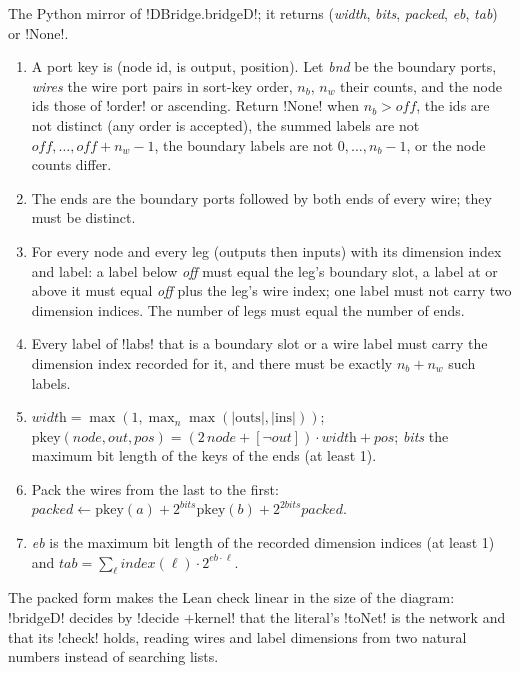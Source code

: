 {\begin{algorithm}[\py!_bridge_plan(d, net, off, legs, labs, order=None)!]\label{alg:lean-export-net-bridge}
The Python mirror of \lean!DBridge.bridgeD!; it returns
(\textit{width}, \textit{bits}, \textit{packed}, \textit{eb}, \textit{tab}) or \py!None!.
\begin{enumerate}
\item A port key is (node id, is output, position). Let \textit{bnd} be the boundary ports,
  \textit{wires} the wire port pairs in sort-key order, $n_b$, $n_w$ their counts, and the node
  ids those of \py!order! or ascending. Return \py!None! when $n_b > \textit{off}$, the ids are not
  distinct (any order is accepted), the summed labels are not $\textit{off},\dots,\textit{off}+n_w-1$, the
  boundary labels are not $0,\dots,n_b-1$, or the node counts differ.
\item The ends are the boundary ports followed by both ends of every wire; they must be
  distinct.
\item For every node and every leg (outputs then inputs) with its dimension index and label:
  a label below \textit{off} must equal the leg's boundary slot, a label at or above it must
  equal \textit{off} plus the leg's wire index; one label must not carry two dimension indices.
  The number of legs must equal the number of ends.
\item Every label of \py!labs! that is a boundary slot or a wire label must carry the dimension
  index recorded for it, and there must be exactly $n_b + n_w$ such labels.
\item $\textit{width} = \max(1, \max_n \max(|\text{outs}|, |\text{ins}|))$;
  $\mathrm{pkey}(\textit{node},\textit{out},\textit{pos}) =
  (2\,\textit{node} + [\lnot\textit{out}])\cdot\textit{width} + \textit{pos}$;
  \textit{bits} the maximum bit length of the keys of the ends (at least 1).
\item Pack the wires from the last to the first:
  $\textit{packed} \leftarrow \mathrm{pkey}(a) + 2^{\textit{bits}}\mathrm{pkey}(b) +
  2^{2\textit{bits}}\textit{packed}$.
\item \textit{eb} is the maximum bit length of the recorded dimension indices (at least 1) and
  $\textit{tab} = \sum_\ell \textit{index}(\ell)\cdot 2^{\textit{eb}\cdot \ell}$.
\end{enumerate}
\end{algorithm}

The packed form makes the Lean check linear in the size of the diagram: \lean!bridgeD! decides by
\lean!decide +kernel! that the literal's \lean!toNet! is the network and that its \lean!check!
holds, reading wires and label dimensions from two natural numbers instead of searching lists.

}
